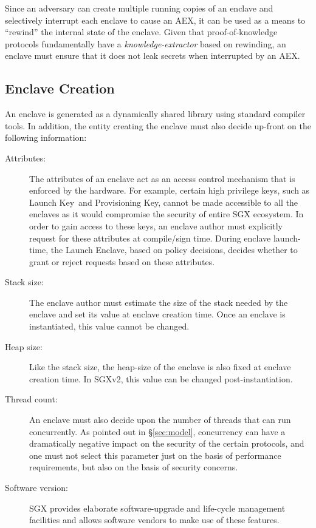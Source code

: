 \documentclass[letterpaper]{article}
\newcommand{\secref}[1]{\S\ref{#1}}
\newcommand{\aex}{\textsf{AEX}}
\newcommand{\launchenclave}{\textsf{Launch Enclave}}
\newcommand{\lk}{\textsf{Launch Key}}
\begin{document}
\begin{description}
    Since an adversary can create multiple running copies of an
    enclave and selectively interrupt each enclave to cause an \aex,
    it can be used as a means to ``rewind'' the internal state of the
    enclave. Given that proof-of-knowledge \cite{BellarePOK} protocols
    fundamentally have a \textit{knowledge-extractor} based on
    rewinding, an enclave must ensure that it does not leak secrets
    when interrupted by an \aex.

  \end{description}

  \subsection{Enclave Creation}
  \label{sec:enclavecreateion}
  An enclave is generated as a dynamically shared library using
  standard compiler tools. In addition, the entity creating the
  enclave must also decide up-front on the following information:

  \begin{description}
  \item[\textsf{Attributes}:] The attributes of an enclave act as an
    access control mechanism that is enforced by the hardware. For
    example, certain high privilege keys, such as \lk\ and
    \textsf{Provisioning Key}, cannot be made accessible to all the
    enclaves as it would compromise the security of entire SGX
    ecosystem. In order to gain access to these keys, an enclave
    author must explicitly request for these attributes at
    compile/sign time. During enclave launch-time, the \launchenclave,
    based on policy decisions, decides whether to grant or reject
    requests based on these attributes.

  \item[\textsf{Stack size}:] The enclave author must estimate the
    size of the stack needed by the enclave and set its value at
    enclave creation time. Once an enclave is instantiated, this value
    cannot be changed.

  \item[\textsf{Heap size}:] Like the stack size, the heap-size of the
    enclave is also fixed at enclave creation time. In SGXv2, this
    value can be changed post-instantiation.

  \item[\textsf{Thread count}:] An enclave must also decide upon the
    number of threads that can run concurrently. As pointed out in
    \secref{sec:model}, concurrency can have a dramatically negative
    impact on the security of the certain protocols, and one must not
    select this parameter just on the basis of performance
    requirements, but also on the basis of security concerns.

  \item[\textsf{Software version}:] SGX provides elaborate
    software-upgrade and life-cycle management facilities and allows
    software vendors to make use of these features.

  \end{description}
\end{document}
